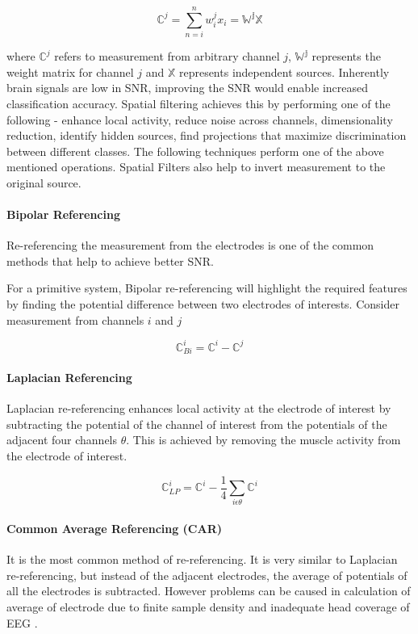 \begin{equation} \label{eq:spat_smear}
    \mathbb{C}^{j} = \sum_{n = i}^{n} w_{i}^{j} x_{i} = \mathbb{W^{j} X} 
\end{equation}

where $\mathbb{C}^{j} $ refers to measurement from arbitrary channel $j$,  $\mathbb{W^j}$ represents the weight matrix for channel $j$ and $\mathbb{X}$ represents independent sources. Inherently brain signals are low in SNR, improving the SNR would enable increased classification accuracy. Spatial filtering achieves this by performing one of the following - enhance local activity, reduce noise across channels, dimensionality reduction, identify hidden sources, find projections that maximize discrimination between different classes. The following techniques perform one of the above mentioned operations. Spatial Filters also help to invert measurement to the original source.

\paragraph{Bipolar Referencing}
Re-referencing the measurement from the electrodes is one of the common methods that help to achieve better SNR.

For a primitive system, Bipolar re-referencing will highlight the required features by finding the potential difference between two electrodes of interests. Consider measurement from channels $i$ and $j$

\begin{equation} \label{eq:bip_eeg}
    \mathbb{C}^{i}_{Bi} =  \mathbb{C}^{i} - \mathbb{C}^{j}
\end{equation}

\paragraph{Laplacian Referencing}
Laplacian re-referencing enhances local activity at the electrode of interest by subtracting the potential of the channel of interest from the potentials of the adjacent four channels $\theta$. This is achieved by removing the muscle activity from the electrode of interest.

\begin{equation} \label{eq:lap_eeg}
    \mathbb{C}^{i}_{LP} =  \mathbb{C}^{i} - \frac{1}{4} \sum_{i \epsilon \theta} \mathbb{C}^{i}
\end{equation}

\paragraph{Common Average Referencing (CAR)}
It is the most common method of re-referencing. It is very similar to Laplacian re-referencing, but instead of the adjacent electrodes, the average of potentials of all the electrodes is subtracted. However problems can be caused in  calculation of average of electrode due to finite sample density and inadequate head coverage of EEG \cite{2022_MI_DL_Old_Survey}.

